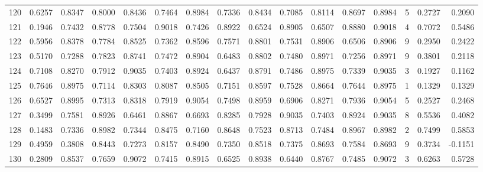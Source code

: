 \begin{tabular}{lrrrrrrrrrrrrrrr}
120 &      0.6257 &  0.8347 &  0.8000 &  0.8436 &  0.7464 &  0.8984 &  0.7336 &  0.8434 &  0.7085 &  0.8114 &   0.8697 &     0.8984 &      5 &                    0.2727 &                     0.2090 \\
121 &      0.1946 &  0.7432 &  0.8778 &  0.7504 &  0.9018 &  0.7426 &  0.8922 &  0.6524 &  0.8905 &  0.6507 &   0.8880 &     0.9018 &      4 &                    0.7072 &                     0.5486 \\
122 &      0.5956 &  0.8378 &  0.7784 &  0.8525 &  0.7362 &  0.8596 &  0.7571 &  0.8801 &  0.7531 &  0.8906 &   0.6506 &     0.8906 &      9 &                    0.2950 &                     0.2422 \\
123 &      0.5170 &  0.7288 &  0.7823 &  0.8741 &  0.7472 &  0.8904 &  0.6483 &  0.8802 &  0.7480 &  0.8971 &   0.7256 &     0.8971 &      9 &                    0.3801 &                     0.2118 \\
124 &      0.7108 &  0.8270 &  0.7912 &  0.9035 &  0.7403 &  0.8924 &  0.6437 &  0.8791 &  0.7486 &  0.8975 &   0.7339 &     0.9035 &      3 &                    0.1927 &                     0.1162 \\
125 &      0.7646 &  0.8975 &  0.7114 &  0.8303 &  0.8087 &  0.8505 &  0.7151 &  0.8597 &  0.7528 &  0.8664 &   0.7644 &     0.8975 &      1 &                    0.1329 &                     0.1329 \\
126 &      0.6527 &  0.8995 &  0.7313 &  0.8318 &  0.7919 &  0.9054 &  0.7498 &  0.8959 &  0.6906 &  0.8271 &   0.7936 &     0.9054 &      5 &                    0.2527 &                     0.2468 \\
127 &      0.3499 &  0.7581 &  0.8926 &  0.6461 &  0.8867 &  0.6693 &  0.8285 &  0.7928 &  0.9035 &  0.7403 &   0.8924 &     0.9035 &      8 &                    0.5536 &                     0.4082 \\
128 &      0.1483 &  0.7336 &  0.8982 &  0.7344 &  0.8475 &  0.7160 &  0.8648 &  0.7523 &  0.8713 &  0.7484 &   0.8967 &     0.8982 &      2 &                    0.7499 &                     0.5853 \\
129 &      0.4959 &  0.3808 &  0.8443 &  0.7273 &  0.8157 &  0.8490 &  0.7350 &  0.8518 &  0.7375 &  0.8693 &   0.7584 &     0.8693 &      9 &                    0.3734 &                    -0.1151 \\
130 &      0.2809 &  0.8537 &  0.7659 &  0.9072 &  0.7415 &  0.8915 &  0.6525 &  0.8938 &  0.6440 &  0.8767 &   0.7485 &     0.9072 &      3 &                    0.6263 &                     0.5728 \\

\end{tabular}
